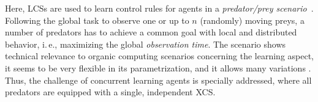 Here, LCSs are used to learn control rules for agents in a \emph{predator/prey scenario}~\cite{BJD86}. Following the global task to observe one or up to $n$ (randomly) moving preys, a number of predators has to achieve a common goal with local and distributed behavior, i.\,e., maximizing the global \emph{observation time}. The scenario shows technical relevance to organic computing scenarios concerning the learning aspect, it seems to be very flexible in its parametrization, and it allows many variations \cite{SV00}. %
Thus, the challenge of concurrent learning agents is specially addressed, where all predators are equipped with a single, independent XCS.
